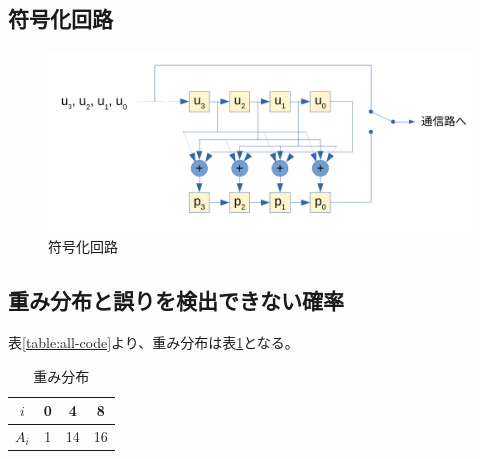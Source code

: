 \documentclass[a4paper,11pt]{jsarticle}
\begin{document}
\subsection{符号化回路}

\begin{figure}[htbp]
  \begin{center}
  \includegraphics[scale=0.7]{figures/circuit001.pdf}
  \end{center}
  \caption{符号化回路
  \label{fig:pm1}
  }
\end{figure}

\subsection{重み分布と誤りを検出できない確率}
表\ref{table:all-code}より、重み分布は表\ref{table:weight-dist}となる。

\begin{table}[hbtp]
  \caption{重み分布}
  \label{table:weight-dist}
  \centering
  \begin{tabular}{|c|ccc|}
    \hline
    $i$ & 0 & 4 & 8 \\ \hline
    $A_i$ & 1 & 14 & 16 \\ \hline
  \end{tabular}
\end{table}
\end{document}
